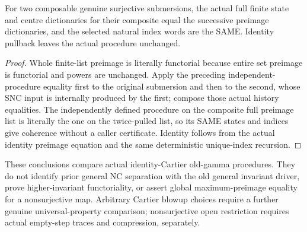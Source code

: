 \begin{theorem}
\label{hir:submersion-ordered-procedure-composition}
\leanok
For two composable genuine surjective submersions, the actual full finite
state and centre dictionaries for their composite equal the successive
preimage dictionaries, and the selected natural index words are the SAME.
Identity pullback leaves the actual procedure unchanged.
\end{theorem}
\begin{proof}
Whole finite-list preimage is literally functorial because entire set
preimage is functorial and powers are unchanged. Apply the preceding
independent-procedure equality first to the original submersion and then
to the second, whose SNC input is internally produced by the first; compose
those actual history equalities. The independently defined procedure on the
composite full preimage list is literally the one on the twice-pulled list,
so its SAME states and indices give coherence without a caller certificate. Identity follows
from the actual identity preimage equation and the same deterministic
unique-index recursion.
\end{proof}

These conclusions compare actual identity-Cartier old-gamma procedures.
They do not identify prior general NC separation with the old general
invariant driver, prove higher-invariant functoriality, or assert global
maximum-preimage equality for a nonsurjective map. Arbitrary Cartier blowup
choices require a further genuine universal-property comparison; nonsurjective
open restriction requires actual empty-step traces and compression, separately.
